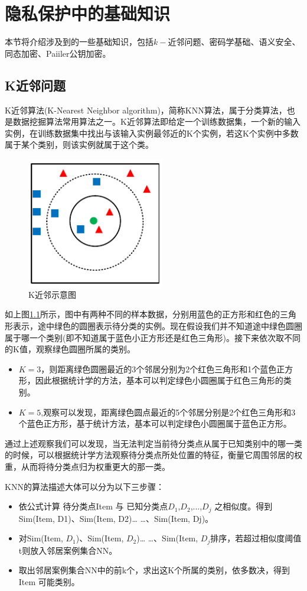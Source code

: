 \chapter{隐私保护中的基础知识}
\vspace{-0.2cm}
本节将介绍涉及到的一些基础知识，包括$k-$近邻问题、密码学基础、语义安全、同态加密、Paiiler公钥加密。
\section{K近邻问题}
K近邻算法(K-Nearest Neighbor algorithm)，简称KNN算法，属于分类算法，也是数据挖掘算法常用算法之一。K近邻算法即给定一个训练数据集，一个新的输入实例，在训练数据集中找出与该输入实例最邻近的K个实例，若这K个实例中多数属于某个类别，则该实例就属于这个类。
\begin{figure}[H]
\centering
\includegraphics[width=6cm]{fig/KNN.pdf}
\caption{K近邻示意图} %
\label{fig:KNN_pdf}
\end{figure}
如上图\ref{fig:KNN_pdf}所示，图中有两种不同的样本数据，分别用蓝色的正方形和红色的三角形表示，途中绿色的圆圈表示待分类的实例。现在假设我们并不知道途中绿色圆圈属于哪一个类别(即不知道属于蓝色小正方形还是红色三角形)。接下来依次取不同的K值，观察绿色圆圈所属的类别。
\begin{itemize}
\item $K=3$，则距离绿色圆圈最近的3个邻居分别为2个红色三角形和1个蓝色正方形，因此根据统计学的方法，基本可以判定绿色小圆圈属于红色三角形的类别。
\item $K=5$,观察可以发现，距离绿色圆点最近的5个邻居分别是2个红色三角形和3个蓝色正方形，基于统计方法，基本可以判定绿色小圆圈属于蓝色正方形。
\end{itemize}
通过上述观察我们可以发现，当无法判定当前待分类点从属于已知类别中的哪一类的时候，可以根据统计学方法观察待分类点所处位置的特征，衡量它周围邻居的权重，从而将待分类点归为权重更大的那一类。

KNN的算法描述大体可以分为以下三步骤：
\begin{itemize}
\item 依公式计算 待分类点Item 与 已知分类点$D_1$,$D_2$,...,$D_j$ 之相似度。得到Sim(Item, D1)、Sim(Item, D2)… …、Sim(Item, Dj)。
\item 对Sim(Item, $D_1$)、Sim(Item, $D_2$)… …、Sim(Item, $D_j$排序，若超过相似度阈值t则放入邻居案例集合NN。
\item 取出邻居案例集合NN中的前k个，求出这K个所属的类别，依多数决，得到Item 可能类别。
\end{itemize}

